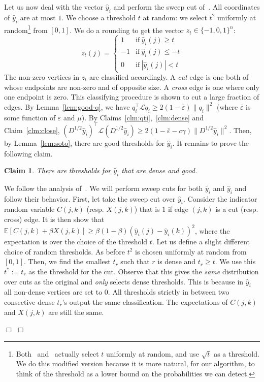 \documentclass[11pt]{article}
\newtheorem{claim}[theorem]{Claim}
\newenvironment{myproof}{\noindent {\sc Proof:}}{$\Box$}
\newcommand\E{{\mathbb{E}}}
\def\epsilon{\varepsilon}
\def\lap{{\mathcal L}}
\newcommand\qi{q_i}
\newcommand\qhi{\widehat{y}_i}
\newcommand\qti{\widetilde{y_i}}
\newcommand\dense{\qhi}
\def\Dhalf{D^{1/2}}
\begin{document}
\begin{myproof}
Let us now deal with the vector $\dense$ and perform the sweep cut
of~\cite{Tre09}.
All coordinates of $\dense$ are at most $1$. We choose a threshold
$t$ at random: we select $t^2$ uniformly at random\footnote{Both~\cite{Tre09}
and~\cite{Sot09} actually select $t$ uniformly at random, and use $\sqrt{t}$ as
a threshold. We do this modified version because it is more natural, for our
algorithm, to think of the threshold as a lower bound on the probabilities
we can detect.} from $[0,1]$. We do a rounding
to get the vector $z_t \in \{-1,0,1\}^n$:
$$z_t(j) = \begin{cases}
1 & \text{if} \  \qhi(j) \geq t \\
-1 & \text{if} \  \qhi(j) \leq -t \\
0 & \text{if} \  |\qhi(j)| < t
\end{cases}
$$
The non-zero vertices in $z_t$ are classified accordingly.
A \emph{cut} edge is one both of whose endpoints are non-zero
and of opposite size. A \emph{cross} edge is one where
only one endpoint is zero.
This classifying procedure is shown to cut a large
fraction of edges. By Lemma~\ref{lem:good-q}, we have
$\qi^\top \lap \qi \geq 2(1-\bar{\epsilon}) \|\qi\|^2$ (where $\bar{\epsilon}$
is some function of $\epsilon$ and $\mu$).
By Claims~\ref{clm:qti},~\ref{clm:dense} and Claim~\ref{clm:close},
$(\Dhalf\qhi)^\top \lap (\Dhalf\qhi) \geq 2(1-\bar{\epsilon}-c\gamma) \|\Dhalf\qhi\|^2$.
Then, by Lemma~\ref{lem:soto}, there are good thresholds for $\qhi$.
It remains to prove the following claim.

\begin{claim} \label{clm:couple} There are thresholds for $\qti$
that are dense \emph{and} good.
\end{claim}

\begin{myproof} We follow the analysis of~\cite{Sot09}.
We will perform sweep cuts for both $\qti$ and $\qhi$
and follow their behavior.
First, let take the sweep cut over $\qhi$.
Consider the indicator random variable $C(j,k)$ (resp. $X(j,k)$) that is $1$
if edge $(j,k)$ is a cut (resp. cross) edge. It is then
show that $\E[C(j,k) + \beta X(j,k)] \geq \beta(1-\beta)(\dense(j) - \dense(k))^2$,
where the expectation is over the choice of the threshold $t$.
Let us define a slight different choice of random thresholds.
As before $t^2$ is chosen uniformly at random from $[0,1]$.
Then, we find the smallest $t_r$ such that $r$ is dense
and $t_r \geq t$. We use this $t^* := t_r$ as the threshold for the cut.
Observe that this gives the \emph{same} distribution over
cuts as the original and \emph{only} selects dense thresholds. This is because in $\qhi$ all non-dense
vertices are set to $0$. All thresholds strictly in
between two consective dense $t_r$'s output the same
classification. The expectations of $C(j,k)$ and $X(j,k)$
are still the same.


\end{myproof}
\end{myproof}
\end{document}
